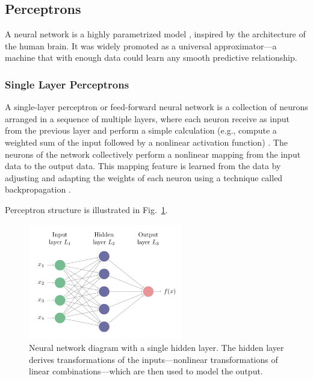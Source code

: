 \subsection{Perceptrons}

A neural network is a highly parametrized model \cite{efron2016computer}, inspired by the architecture of the human brain. It was widely promoted as a universal approximator—a machine that with enough data could learn any smooth predictive relationship.

\subsubsection*{Single Layer Perceptrons}

A single-layer perceptron or feed-forward neural network is a collection of neurons arranged in a sequence of multiple layers, where each neuron receive as input from the previous layer and perform a simple calculation (e.g., compute a weighted sum of the input followed by a nonlinear activation function) \cite{efron2016computer}. The neurons of the network collectively perform a nonlinear mapping from the input data to the output data. This mapping feature is learned from the data by adjusting and adapting the weights of each neuron using a technique called backpropagation \cite{efron2016computer}.

Perceptron structure is illustrated in Fig.~\ref{fig:perceptron}.

\begin{figure}[htbp]
\centering
\includegraphics[width=0.6\textwidth]{images/perceptron.png}
\caption{Neural network diagram with a single hidden layer. The hidden layer derives transformations of the inputs—nonlinear transformations of linear combinations—which are then used to model the output. \protect\footnotemark}
\label{fig:perceptron}
\end{figure}

\vspace*{-2em}
